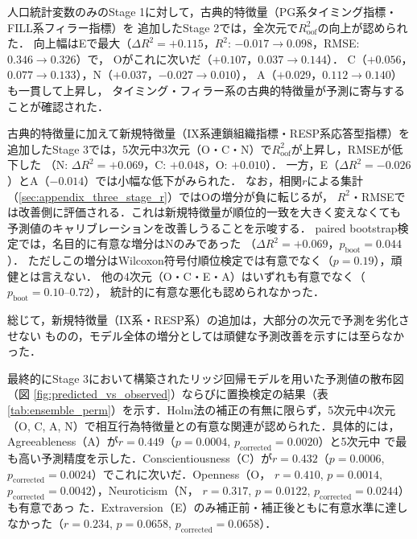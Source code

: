 \documentclass[dvipdfmx,11pt,a4paper]{bxjsarticle}
\renewcommand{\_}{\paperorigunderscore\allowbreak}%
\begin{document}
人口統計変数のみのStage 1に対して，古典的特徴量（PG系タイミング指標・FILL系フィラー指標）を
追加したStage 2では，全次元で$R^2_{\text{oof}}$の向上が認められた．
向上幅はEで最大（$\Delta R^2 = +0.115$，$R^2$: $-0.017 \to 0.098$，RMSE: $0.346 \to 0.326$）で，
Oがこれに次いだ（$+0.107$，$0.037 \to 0.144$）．
C（$+0.056$，$0.077 \to 0.133$），N（$+0.037$，$-0.027 \to 0.010$），
A（$+0.029$，$0.112 \to 0.140$）も一貫して上昇し，
タイミング・フィラー系の古典的特徴量が予測に寄与することが確認された．

古典的特徴量に加えて新規特徴量（IX系連鎖組織指標・RESP系応答型指標）を
追加したStage 3では，5次元中3次元（O・C・N）で$R^2_{\text{oof}}$が上昇し，RMSEが低下した
（N: $\Delta R^2 = +0.069$，C: $+0.048$，O: $+0.010$）．
一方，E（$\Delta R^2 = -0.026$）とA（$-0.014$）では小幅な低下がみられた．
なお，相関$r$による集計（\ref{sec:appendix_three_stage_r}）ではOの増分が負に転じるが，
$R^2$・RMSEでは改善側に評価される．これは新規特徴量が順位的一致を大きく変えなくても
予測値のキャリブレーションを改善しうることを示唆する．
paired bootstrap検定では，名目的に有意な増分はNのみであった
（$\Delta R^2 = +0.069$，$p_{\text{boot}} = 0.044$）．
ただしこの増分はWilcoxon符号付順位検定では有意でなく（$p = 0.19$），頑健とは言えない．
他の4次元（O・C・E・A）はいずれも有意でなく（$p_{\text{boot}} = 0.10$--$0.72$），
統計的に有意な悪化も認められなかった．

総じて，新規特徴量（IX系・RESP系）の追加は，大部分の次元で予測を劣化させない
ものの，モデル全体の増分としては頑健な予測改善を示すには至らなかった．



最終的にStage 3において構築されたリッジ回帰モデルを用いた予測値の散布図（図
\ref{fig:predicted_vs_observed}）ならびに置換検定の結果（表
\ref{tab:ensemble_perm}）を示す．Holm法の補正の有無に限らず，5次元中4次元（O, C,
A, N）で相互行為特徴量との有意な関連が認められた．具体的には，Agreeableness（A）が$r = 0.449$（$p = 0.0004$, $p_{\text{corrected}} = 0.0020$）と5次元中
で最も高い予測精度を示した．Conscientiousness（C）が$r = 0.432$（$p =
0.0006$, $p_{\text{corrected}} = 0.0024$）でこれに次いだ．Openness（O，
$r = 0.410$, $p = 0.0014$, $p_{\text{corrected}} = 0.0042$），Neuroticism（N，
$r = 0.317$, $p = 0.0122$, $p_{\text{corrected}} = 0.0244$）も有意であっ
た．Extraversion（E）のみ補正前・補正後ともに有意水準に達しなかった（$r
= 0.234$, $p = 0.0658$, $p_{\text{corrected}} = 0.0658$）．
\end{document}
